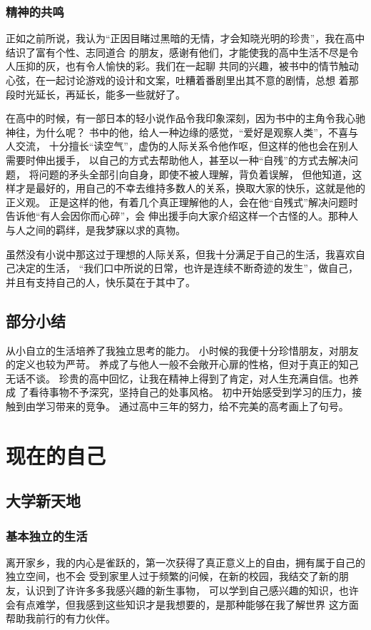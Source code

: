 \documentclass[AutoFakeBold]{LZUThesis}
\begin{document}
\subsection{精神的共鸣}
正如之前所说，我认为“正因目睹过黑暗的无情，才会知晓光明的珍贵”，我在高中结识了富有个性、志同道合
的朋友，感谢有他们，才能使我的高中生活不尽是令人压抑的灰，也有令人愉快的彩。我们在一起聊
共同的兴趣，被书中的情节触动心弦，在一起讨论游戏的设计和文案，吐糟着番剧里出其不意的剧情，总想
着那段时光延长，再延长，能多一些就好了。

在高中的时候，有一部日本的轻小说作品令我印象深刻，因为书中的主角令我心驰神往，为什么呢？
书中的他，给人一种边缘的感觉，“爱好是观察人类”，不喜与人交流，
十分擅长“读空气”，虚伪的人际关系令他作呕，但这样的他也会在别人需要时伸出援手，
以自己的方式去帮助他人，甚至以一种“自残”的方式去解决问题，
将问题的矛头全部引向自身，即使不被人理解，背负着误解，
但他知道，这样才是最好的，用自己的不幸去维持多数人的关系，换取大家的快乐，这就是他的正义观。
正是这样的他，有着几个真正理解他的人，会在他“自残式”解决问题时告诉他“有人会因你而心碎”，会
伸出援手向大家介绍这样一个古怪的人。那种人与人之间的羁绊，是我梦寐以求的真物。

虽然没有小说中那这过于理想的人际关系，但我十分满足于自己的生活，我喜欢自己决定的生活，
“我们口中所说的日常，也许是连续不断奇迹的发生”，做自己，并且有支持自己的人，快乐莫在于其中了。


\section{部分小结}
从小自立的生活培养了我独立思考的能力。
小时候的我便十分珍惜朋友，对朋友的定义也较为严苛。
养成了与他人一般不会敞开心扉的性格，但对于真正的知己无话不谈。
珍贵的高中回忆，让我在精神上得到了肯定，对人生充满自信。也养成
了看待事物不予深究，坚持自己的处事风格。
初中开始感受到学习的压力，接触到由学习带来的竞争。
通过高中三年的努力，给不完美的高考画上了句号。

\chapter{现在的自己}

\section{大学新天地}

\subsection{基本独立的生活}
离开家乡，我的内心是雀跃的，第一次获得了真正意义上的自由，拥有属于自己的独立空间，也不会
受到家里人过于频繁的问候，在新的校园，我结交了新的朋友，认识到了许许多多我感兴趣的新生事物，
可以学到自己感兴趣的知识，也许会有点难学，但我感到这些知识才是我想要的，是那种能够在我了解世界
这方面帮助我前行的有力伙伴。
\end{document}
